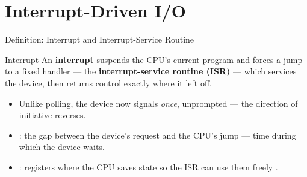 \documentclass[aspectratio=169]{beamer}
\begin{document}
\section{Interrupt-Driven I/O}

\begin{frame}{Definition: Interrupt and Interrupt-Service Routine}
  \begin{center}
  \end{center}
  \vspace{-0.15cm}
  \begin{block}{Interrupt}
    An \textbf{interrupt} suspends the CPU's current program and forces a
    jump to a fixed handler --- the \textbf{interrupt-service routine
    (ISR)} --- which services the device, then returns control exactly where
    it left off.
  \end{block}
  \begin{itemize}
    \item Unlike polling, the device now signals \emph{once},
      unprompted --- the direction of initiative reverses.
    \item {}: the gap between the device's request and
      the CPU's jump --- time during which the device waits.
    \item {}: registers where the CPU saves state so the
      ISR can use them freely \cite{Hamacher2002_computer_organization}.
  \end{itemize}
\end{frame}
\end{document}

